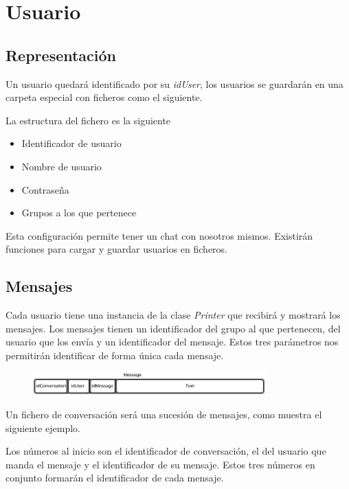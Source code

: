 \section{Usuario}
\subsection{Representación}
Un usuario quedará identificado por su \textit{idUser}, los usuarios se guardarán en una carpeta especial con ficheros como el siguiente.

La estructura del fichero es la siguiente
\begin{itemize}
	\item Identificador de usuario
	\item Nombre de usuario
	\item Contraseña
	\item Grupos a los que pertenece
\end{itemize}

Esta configuración permite tener un chat con nosotros mismos.
Existirán funciones para cargar y guardar usuarios en ficheros.


\subsection{Mensajes}
Cada usuario tiene una instancia de la clase \textit{Printer} que recibirá y mostrará los mensajes.
Los mensajes tienen un identificador del grupo al que pertenecen, del usuario que los envía y un identificador del mensaje.
Estos tres parámetros nos permitirán identificar de forma única cada mensaje.

\begin{figure}[H]
	\centering
	\includegraphics[width=0.8\textwidth]{./Imagenes/message.png}
\end{figure}

Un fichero de conversación será una sucesión de mensajes, como muestra el siguiente ejemplo.



Los números al inicio son el identificador de conversación, el del usuario que manda el mensaje y el identificador de su mensaje.
Estos tres números en conjunto formarán el identificador de cada mensaje.
